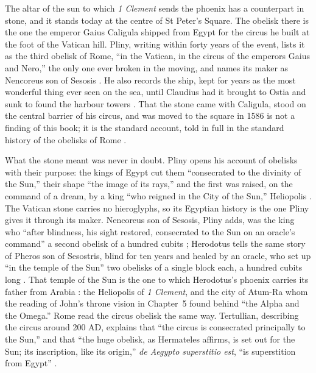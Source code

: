 The altar of the sun to which \emph{1 Clement} sends the phoenix has a counterpart in stone, and it stands today at the centre of St Peter's Square.
The obelisk there is the one the emperor Gaius Caligula shipped from Egypt for the circus he built at the foot of the Vatican hill.
Pliny, writing within forty years of the event, lists it as the third obelisk of Rome, ``in the Vatican, in the circus of the emperors Gaius and Nero,'' the only one ever broken in the moving, and names its maker as Nencoreus son of Sesosis \cite[36.74]{pliny:nh}.
He also records the ship, kept for years as the most wonderful thing ever seen on the sea, until Claudius had it brought to Ostia and sunk to found the harbour towers \cite[36.70]{pliny:nh}.
That the stone came with Caligula, stood on the central barrier of his circus, and was moved to the square in 1586 is not a finding of this book; it is the standard account, told in full in the standard history of the obelisks of Rome \cite{iversen:obelisks-in-exile}.

What the stone meant was never in doubt.
Pliny opens his account of obelisks with their purpose: the kings of Egypt cut them ``consecrated to the divinity of the Sun,'' their shape ``the image of its rays,'' and the first was raised, on the command of a dream, by a king ``who reigned in the City of the Sun,'' Heliopolis \cite[36.64]{pliny:nh}.
The Vatican stone carries no hieroglyphs, so its Egyptian history is the one Pliny gives it through its maker.
Nencoreus son of Sesosis, Pliny adds, was the king who ``after blindness, his sight restored, consecrated to the Sun on an oracle's command'' a second obelisk of a hundred cubits \cite[36.74]{pliny:nh}; Herodotus tells the same story of Pheros son of Sesostris, blind for ten years and healed by an oracle, who set up ``in the temple of the Sun'' two obelisks of a single block each, a hundred cubits long \cite[2.111]{herodotus:histories}.
That temple of the Sun is the one to which Herodotus's phoenix carries its father from Arabia \cite[2.73]{herodotus:histories}: the Heliopolis of \emph{1 Clement}, and the city of Atum-Ra whom the reading of John's throne vision in Chapter~5 found behind ``the Alpha and the Omega.''
Rome read the circus obelisk the same way.
Tertullian, describing the circus around 200 AD, explains that ``the circus is consecrated principally to the Sun,'' and that ``the huge obelisk, as Hermateles affirms, is set out for the Sun; its inscription, like its origin,'' \emph{de Aegypto superstitio est}, ``is superstition from Egypt'' \cite[8]{tertullian:spectaculis}.

